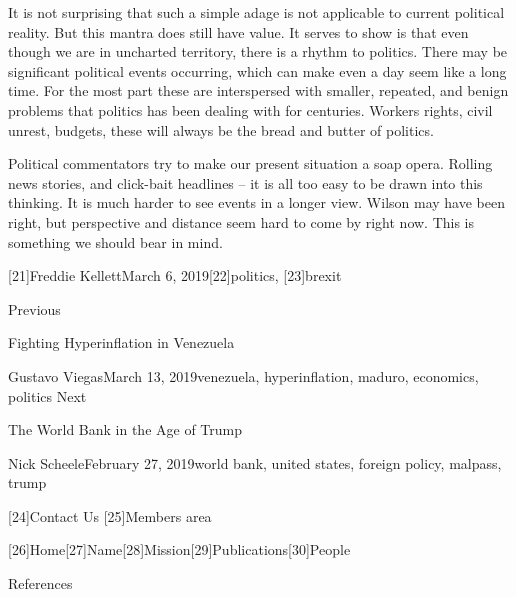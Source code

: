    It is not surprising that such a simple adage is not applicable to
   current political reality. But this mantra does still have value. It
   serves to show is that even though we are in uncharted territory, there
   is a rhythm to politics. There may be significant political events
   occurring, which can make even a day seem like a long time. For the
   most part these are interspersed with smaller, repeated, and benign
   problems that politics has been dealing with for centuries. Workers
   rights, civil unrest, budgets, these will always be the bread and
   butter of politics.

   Political commentators try to make our present situation a soap opera.
   Rolling news stories, and click-bait headlines -- it is all too easy to
   be drawn into this thinking. It is much harder to see events in a
   longer view. Wilson may have been right, but perspective and distance
   seem hard to come by right now. This is something we should bear in
   mind.

   [21]Freddie KellettMarch 6, 2019[22]politics, [23]brexit

   Previous

Fighting Hyperinflation in Venezuela

   Gustavo ViegasMarch 13, 2019venezuela, hyperinflation, maduro,
   economics, politics
   Next

The World Bank in the Age of Trump

   Nick ScheeleFebruary 27, 2019world bank, united states, foreign policy,
   malpass, trump

   [24]Contact Us
   [25]Members area

   [26]Home[27]Name[28]Mission[29]Publications[30]People

References

